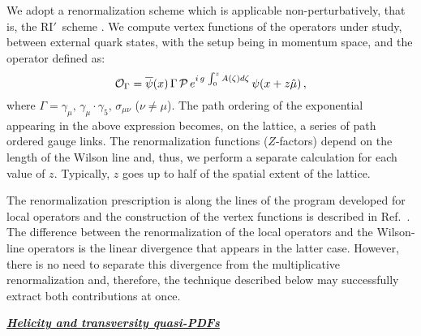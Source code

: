 \documentclass[12pt,tighten,nofootinbib,amssymb,floatfix]{article}
\newcommand{\be}{\begin{equation}}
\newcommand{\ee}{\end{equation}}
\begin{document}
\medskip
We adopt a renormalization scheme which is applicable non-perturbatively, that is, the RI$'$~scheme \cite{Martinelli:1994ty}. 
We compute vertex functions of the operators under study, between external quark states, with the setup being in momentum 
space, and the operator defined as:
\be
{\cal O}_\Gamma = \overline \psi(x) \, \Gamma \,\mathcal{P}\, e^{i\,g\,\int_{0}^{z} A(\zeta) d\zeta}\, \psi(x+z\hat{\mu})\,,
\ee
where $\Gamma=\gamma_\mu,\,\gamma_\mu\cdot\gamma_5,\,\sigma_{\mu\nu}$ ($\nu\neq\mu$). The path ordering of the exponential 
appearing in the above expression becomes, on the lattice, a series of path ordered gauge links. The renormalization functions
($Z$-factors) depend on the length of the Wilson line and, thus, we perform a separate calculation for each value of $z$. Typically, $z$
goes up to half of the spatial extent of the lattice.

\medskip
The renormalization prescription is along the lines of the program developed for local operators and the construction of the vertex functions is
described in Ref.~\cite{Alexandrou:2010me}. The difference between the renormalization of the local operators and
the Wilson-line operators is the linear divergence that appears in the latter case. However, there is no need to separate this divergence
from the multiplicative renormalization and, therefore, the technique described below may successfully extract both contributions
at once. 

\vspace*{0.55cm}
\centerline{\bf\underline{\textit{Helicity and transversity quasi-PDFs}}}
\vskip 0.25cm
\end{document}
